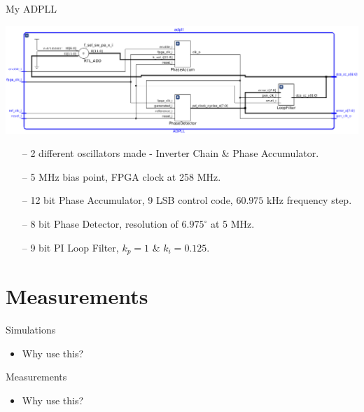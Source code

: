 \documentclass{beamer}
\begin{document}
\begin{frame}{My ADPLL}
 	\begin{center}
 		\includegraphics[scale=0.25]{../ADPLL_RTL_VIVADO}
 	\end{center}
		
	\begin{itemize}
		\item[--]
			2 different oscillators made - Inverter Chain \& Phase Accumulator.
		\item[--]
			5 MHz bias point, FPGA clock at 258 MHz.
		\item[--]
			12 bit Phase Accumulator, 9 LSB control code, $60.975$ kHz frequency step.
		\item[--]
			8 bit Phase Detector, resolution of $6.975^\circ$ at 5 MHz.
		\item[--]
			9 bit PI Loop Filter, $k_p=1$ \& $k_i=0.125$. %
	\end{itemize}
\end{frame}

\section*{Measurements}
\begin{frame}{Simulations}

\begin{itemize}
    \item
	Why use this?
\end{itemize}

\end{frame}

\begin{frame}{Measurements}

    \begin{itemize}
        \item
            Why use this?
    \end{itemize}
 
\end{frame}
\end{document}

